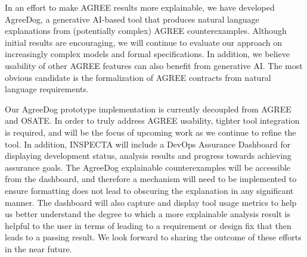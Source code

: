 
In an effort to make AGREE results more explainable, we have developed AgreeDog, a generative AI-based tool that produces natural language explanations from (potentially complex) AGREE counterexamples. 
%
%
Although initial results are encouraging, we will continue to evaluate our approach on increasingly complex models and formal specifications.  In addition, we believe usability of other AGREE features can also benefit from generative AI.  The most obvious candidate is the formalization of AGREE contracts from natural language requirements.   

Our AgreeDog prototype implementation is currently decoupled from AGREE and OSATE.  In order to truly address AGREE usability, tighter tool integration is required, and will be the focus of upcoming work as we continue to refine the tool.
%
In addition, INSPECTA will include a DevOps Assurance Dashboard for displaying development status, analysis results and progress towards achieving assurance goals.  The AgreeDog explainable counterexamples will be accessible from the dashboard, and therefore a mechanism will need to be implemented to ensure formatting does not lead to obscuring the explanation in any significant manner.
The dashboard will also capture and display tool usage metrics to help us better understand the degree to which a more explainable analysis result is helpful to the user in terms of leading to a requirement or design fix that then leads to a passing result. 
%
We look forward to sharing the outcome of these efforts in the near future.